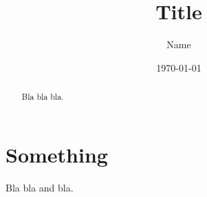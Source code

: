 \documentclass[
    fontsize=11pt,
    paper=a4,
    DIV=11,
    headings=small,
]{scrartcl}
\title{Title}
\author{Name}
\date{\today}
\begin{document}
\maketitle

\begin{abstract}
Bla bla bla.
\end{abstract}

\section{Something}
Bla bla and bla.
\end{document}
